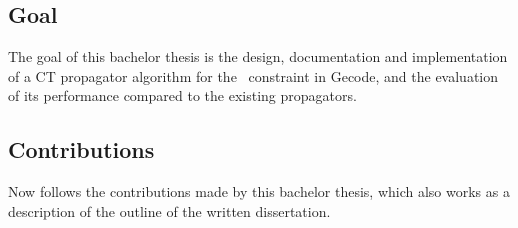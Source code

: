 \documentclass[a4paper,11pt]{article}
\newcommand{\Todo}[1]{{\color{blue}#1}}
\newcommand{\Table}{\Constraint{Table}}
\newcommand{\CTpaper}[0]{DBLP:conf/cp/DemeulenaereHLP16}
\numberwithin{equation}{section}
\begin{document}

\subsection{Goal}
\label{intro:goal}
The goal of this bachelor thesis is the design, documentation and implementation
of a CT propagator algorithm for the \Table~constraint in Gecode,
and the evaluation of its performance compared to the existing propagators.

\subsection{Contributions}
\label{intro:contributions}


Now follows the contributions made by this bachelor thesis, which also works as a
description of the outline of the written dissertation.

\end{document}
